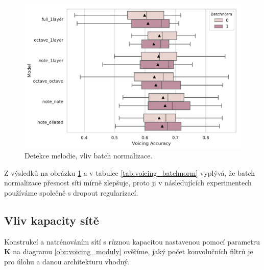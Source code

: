 \begin{figure}[h]\centering
    \includegraphics[scale=0.6]{../img/figures/voicing_batchnorm}
\caption{Detekce melodie, vliv batch normalizace.}\label{obr:voicing_batchnorm}
\end{figure}

Z výsledků na obrázku \ref{obr:voicing_batchnorm} a v tabulce \ref{tab:voicing_batchnorm} vyplývá, že batch normalizace přesnost sítí mírně zlepšuje, proto ji v následujících experimentech používáme společně s dropout regularizací.

\subsection{Vliv kapacity sítě}

Konstrukcí a natrénováním sítí s různou kapacitou nastavenou pomocí parametru $\mathbf{K}$ na diagramu \ref{obr:voicing_moduly} ověříme, jaký počet konvolučních filtrů je pro úlohu a danou architekturu vhodný. 

